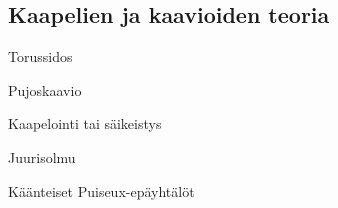 \subsection{Kaapelien ja kaavioiden teoria}
\begin{maaritelma}
    Torussidos
\end{maaritelma}
\begin{maaritelma}
    Pujoskaavio
\end{maaritelma}
\begin{maaritelma}
    Kaapelointi tai säikeistys
\end{maaritelma}
\begin{maaritelma}
    Juurisolmu
\end{maaritelma}
\begin{lause}
    Käänteiset Puiseux-epäyhtälöt
\end{lause}